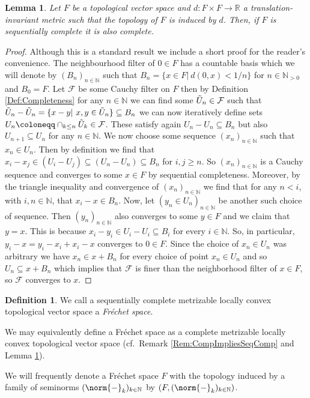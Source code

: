 \documentclass[12pt,a4paper]{article}
\theoremstyle{plain}
\newtheorem{lemma}[theorem]{Lemma}
\theoremstyle{definition}
\newtheorem{definition}[theorem]{Definition}
\newcommand{\R}{\mathbb{R}}
\newcommand{\N}{\mathbb{N}}
\newcommand{\nnorm}[2]{\norm{#1}_{#2}}
\begin{document}
\begin{lemma}
\label{Lemma:MetrizableSeqCompImpliesComp}
Let $F$ be a topological vector space and $d:F\times F\to \R$ a translation-invariant metric such that the topology of $F$ is induced by $d$. Then, if $F$ is sequentially complete it is also complete.
\end{lemma}
\begin{proof}
Although this is a standard result we include a short proof for the reader's convenience.
The neighbourhood filter of $0\in F$ has a countable basis which we will denote by $(B_n)_{n\in \N}$ such that $B_n=\{x\in F|~d(0,x)<1/n\}$ for $n\in \N_{>0}$ and $B_0=F$. Let $\mathcal F$ be some Cauchy filter on $F$ then by Definition \ref{Def:Completeness} for any $n\in \N$ we can find some $\Tilde U_n\in \mathcal F$ such that $\Tilde{U}_n-\Tilde{U}_n=\{x-y|~x,y\in \Tilde{U}_n\}\subseteq B_n$ we can now iteratively define sets $U_n\coloneqq \cap_{k\leq n} \Tilde{U}_k\in \mathcal F$. These satisfy again $U_n-U_n\subseteq B_n$ but also $U_{n+1}\subseteq U_n$ for any $n\in \N$. We now choose some sequence $(x_n)_{n\in \N}$ such that $x_n\in U_n$. Then by definition we find that $x_i-x_j\in (U_i-U_j)\subseteq (U_n-U_n)\subseteq  B_n$ for $i,j\geq n$. So $(x_n)_{n\in \N}$ is a Cauchy sequence and converges to some $x\in F$ by sequential completeness. Moreover, by the triangle inequality and convergence of $(x_n)_{n\in \N}$ we find that for any $n<i$, with $i,n\in \N$, that $x_i-x\in B_n$. Now, let $(y_n\in U_n)_{n\in \N}$ be another such choice of sequence. Then $(y_n)_{n\in \N}$ also converges to some $y\in F$ and we claim that $y=x$. This is because $x_i-y_i\in U_i-U_i\subseteq B_i$ for every $i\in \N$. So, in particular, $y_i-x=y_i-x_i+x_i-x$ converges to $0\in F$. Since the choice of $x_n\in U_n$ was arbitrary we have $x_n\in x+B_n$ for every choice of point $x_n\in U_n$ and so $U_n\subseteq x+B_n$ which implies that $\mathcal F$ is finer than the neighborhood filter of $x\in F$, so $\mathcal F$ converges to $x$.    
\end{proof}
  


\begin{definition}
We call a sequentially complete metrizable locally convex topological vector space a \textit{Fréchet space}.

We may equivalently define a Fréchet space as a complete metrizable locally convex topological vector space (cf.~Remark \ref{Rem:CompImpliesSeqComp} and Lemma \ref{Lemma:MetrizableSeqCompImpliesComp}).

We will frequently denote a Fréchet space $F$ with the topology induced by a family of seminorms $(\nnorm{-}{k})_{k\in \N}$ by $(F,(\nnorm{-}{k})_{k\in \N})$.
\end{definition}
\end{document}
